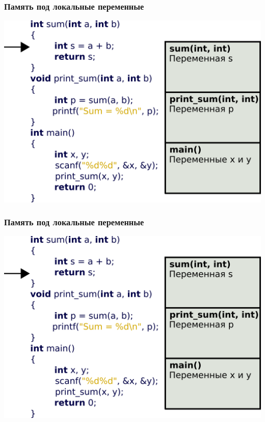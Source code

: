 \documentclass[12pt,pdf,hyperref={unicode}]{beamer}
\begin{document}
\begin{frame}[fragile]
\frametitle{Память под локальные переменные} 
\begin{center}
\includegraphics[width=\linewidth]{images/v_stack4.png}
\end{center}
\end{frame}

\begin{frame}[fragile]
\frametitle{Память под локальные переменные} 
\begin{center}
\includegraphics[width=\linewidth]{images/v_stack5.png}
\end{center}
\end{frame}
\end{document}
